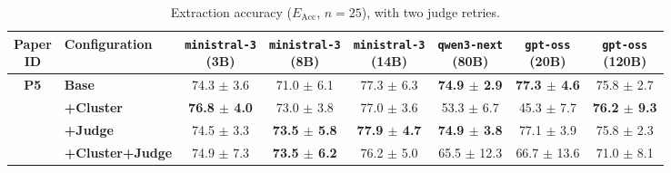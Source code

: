 \begin{table}[htbp]
    \centering
    \small
    \setlength{\tabcolsep}{4pt}
    \caption{Extraction accuracy ($E_{\text{Acc}}$, $n=25$), with two judge retries.}
    \begin{tabular}{c|l|cccccc}
        \toprule
        \makecell{\textbf{Paper} \\ \textbf{ID}} & \textbf{Configuration}& \makecell{\texttt{ministral-3} \\ (3B)} & \makecell{\texttt{ministral-3} \\ (8B)} & \makecell{\texttt{ministral-3} \\ (14B)} & \makecell{\texttt{qwen3-next} \\ (80B)} & \makecell{\texttt{gpt-oss} \\ (20B)} & \makecell{\texttt{gpt-oss} \\ (120B)} \\
        \hline
        
        \multirow{4}{*}{\textbf{P5}} 
          & \textbf{Base}& 74.3 $\pm$ 3.6 & 71.0 $\pm$ 6.1 & 77.3 $\pm$ 6.3 & \textbf{74.9 $\pm$ 2.9} & \textbf{77.3 $\pm$ 4.6} & 75.8 $\pm$ 2.7 \\
          & \textbf{+Cluster}& \textbf{76.8 $\pm$ 4.0} & 73.0 $\pm$ 3.8 & 77.0 $\pm$ 3.6 & 53.3 $\pm$ 6.7 & 45.3 $\pm$ 7.7 & \textbf{76.2 $\pm$ 9.3} \\
          & \textbf{+Judge}& 74.5 $\pm$ 3.3 & \textbf{73.5 $\pm$ 5.8} & \textbf{77.9 $\pm$ 4.7} & \textbf{74.9 $\pm$ 3.8} & 77.1 $\pm$ 3.9 & 75.8 $\pm$ 2.3 \\
          & \textbf{+Cluster+Judge}& 74.9 $\pm$ 7.3 & \textbf{73.5 $\pm$ 6.2} & 76.2 $\pm$ 5.0 & 65.5 $\pm$ 12.3 & 66.7 $\pm$ 13.6 & 71.0 $\pm$ 8.1 \\
        \hline
        
        \bottomrule
    \end{tabular}
    \label{tab:results_p5}
\end{table}